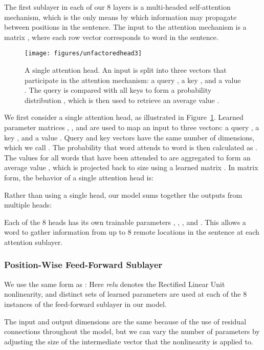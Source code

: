 \documentclass[11pt,a4paper]{article}
\begin{document}
The first sublayer in each of our 8 layers is a multi-headed self-attention mechanism, which is the only means by which information may propagate between positions in the sentence. The input to the attention mechanism is a  matrix , where each row vector  corresponds to word  in the sentence.

\begin{figure}
  \centering
    \texttt{[image: figures/unfactoredhead3]}
    \caption{A single attention head. An input  is split into three vectors that participate in the attention mechanism: a query , a key , and a value . The query  is compared with all keys to form a probability distribution , which is then used to retrieve an average value .}
    \label{fig:unfactored-head}
\end{figure}

We first consider a single attention head, as illustrated in Figure~\ref{fig:unfactored-head}. Learned parameter matrices , , and  are used to map an input  to three vectors: a query , a key , and a value . Query and key vectors have the same number of dimensions, which we call . The probability that word  attends to word  is then calculated as . The values  for all words that have been attended to are aggregated to form an average value , which is projected back to size  using a learned matrix . In matrix form, the behavior of a single attention head is:


Rather than using a single head, our model sums together the outputs from multiple heads:

Each of the 8 heads has its own trainable parameters , , , and . This allows a word to gather information from up to 8 remote locations in the sentence at each attention sublayer.


\subsubsection{Position-Wise Feed-Forward Sublayer}
\label{subsec:feed-forward}

We use the same form as \citet{vaswani_attention_2017}: 
Here \textit{relu} denotes the Rectified Linear Unit nonlinearity, and distinct sets of learned parameters are used at each of the 8 instances of the feed-forward sublayer in our model.

The input and output dimensions are the same because of the use of residual connections throughout the model, but we can vary the number of parameters by adjusting the size of the intermediate vector that the nonlinearity is applied to.
\end{document}
